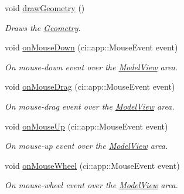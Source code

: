 \begin{DoxyCompactItemize}
void \mbox{\hyperlink{classpepr3d_1_1_model_view_ab428e44311e1ada48f4224f1cfd32915}{draw\+Geometry}} ()
\begin{DoxyCompactList}\small\item\em Draws the \mbox{\hyperlink{classpepr3d_1_1_geometry}{Geometry}}. \end{DoxyCompactList}\item 
\mbox{\label{classpepr3d_1_1_model_view_aa8dcae17a2801bbc3f6f26d919f12224}} 
void \mbox{\hyperlink{classpepr3d_1_1_model_view_aa8dcae17a2801bbc3f6f26d919f12224}{on\+Mouse\+Down}} (ci\+::app\+::\+Mouse\+Event event)
\begin{DoxyCompactList}\small\item\em On mouse-\/down event over the \mbox{\hyperlink{classpepr3d_1_1_model_view}{Model\+View}} area. \end{DoxyCompactList}\item 
\mbox{\label{classpepr3d_1_1_model_view_a661a9c2b434be28bee4b2f30052031f2}} 
void \mbox{\hyperlink{classpepr3d_1_1_model_view_a661a9c2b434be28bee4b2f30052031f2}{on\+Mouse\+Drag}} (ci\+::app\+::\+Mouse\+Event event)
\begin{DoxyCompactList}\small\item\em On mouse-\/drag event over the \mbox{\hyperlink{classpepr3d_1_1_model_view}{Model\+View}} area. \end{DoxyCompactList}\item 
\mbox{\label{classpepr3d_1_1_model_view_a872e02f519f6737a69b427271f6e6c96}} 
void \mbox{\hyperlink{classpepr3d_1_1_model_view_a872e02f519f6737a69b427271f6e6c96}{on\+Mouse\+Up}} (ci\+::app\+::\+Mouse\+Event event)
\begin{DoxyCompactList}\small\item\em On mouse-\/up event over the \mbox{\hyperlink{classpepr3d_1_1_model_view}{Model\+View}} area. \end{DoxyCompactList}\item 
\mbox{\label{classpepr3d_1_1_model_view_a90934c651648861138d6d754be15c140}} 
void \mbox{\hyperlink{classpepr3d_1_1_model_view_a90934c651648861138d6d754be15c140}{on\+Mouse\+Wheel}} (ci\+::app\+::\+Mouse\+Event event)
\begin{DoxyCompactList}\small\item\em On mouse-\/wheel event over the \mbox{\hyperlink{classpepr3d_1_1_model_view}{Model\+View}} area. \end{DoxyCompactList}\item 

\end{DoxyCompactItemize}
